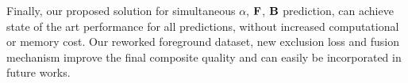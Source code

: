 \documentclass[runningheads]{llncs}
\begin{document}
Finally, our proposed solution for simultaneous $\alpha$, $\mathbf{{{F}}}$, $\mathbf{{{B}}}$ prediction, can achieve state of the art performance for all predictions, without increased computational or memory cost. Our reworked foreground dataset, new exclusion loss and fusion mechanism improve the final composite quality and can easily be incorporated in future works.




\end{document}
